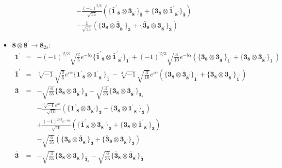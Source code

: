 \documentclass[english]{article}
\newcommand{\subcg}[3]{\big\{ {#1}\otimes{#2}\big\}^{}_{#3}}
\newcommand{\rep}[1]{\mathbf{#1}}
\begin{document}
\begin{itemize}
\begin{eqnarray*}
 & & -\frac{(-1)^{5/6}}{\sqrt{15}}\left(\subcg{\rep{\bar{1}^{\prime}}_{\rep{8}}}{\rep{\bar{3}}_{\rep{8^{\prime}}}}{\rep{\bar{3}}}+\subcg{\rep{\bar{3}}_{\rep{8}}}{\rep{\bar{1}^{\prime}}_{\rep{8^{\prime}}}}{\rep{\bar{3}}}\right) \\ 
 & & -\frac{1}{\sqrt{15}}\left(\subcg{\rep{3}_{\rep{8}}}{\rep{\bar{3}}_{\rep{8^{\prime}}}}{\rep{\bar{3}}}+\subcg{\rep{\bar{3}}_{\rep{8}}}{\rep{3}_{\rep{8^{\prime}}}}{\rep{\bar{3}}}\right)
\end{eqnarray*}
\item $\rep{8}\otimes\rep{8^{\prime}}\to\rep{8}_{2s}$:
\begin{eqnarray*}
\rep{1^{\prime}} &=& -(-1)^{2/3} \sqrt{\frac{2}{5}} e^{-i \alpha }\subcg{\rep{\bar{1}^{\prime}}_{\rep{8}}}{\rep{\bar{1}^{\prime}}_{\rep{8^{\prime}}}}{\rep{1^{\prime}}}+(-1)^{2/3} \sqrt{\frac{3}{10}} e^{-i \alpha }\left(\subcg{\rep{3}_{\rep{8}}}{\rep{\bar{3}}_{\rep{8^{\prime}}}}{\rep{1^{\prime}}}+\subcg{\rep{\bar{3}}_{\rep{8}}}{\rep{3}_{\rep{8^{\prime}}}}{\rep{1^{\prime}}}\right)
\\
\rep{\bar{1}^{\prime}} &=& \sqrt[3]{-1} \sqrt{\frac{2}{5}} e^{i \alpha }\subcg{\rep{1^{\prime}}_{\rep{8}}}{\rep{1^{\prime}}_{\rep{8^{\prime}}}}{\rep{\bar{1}^{\prime}}}-\sqrt[3]{-1} \sqrt{\frac{3}{10}} e^{i \alpha }\left(\subcg{\rep{3}_{\rep{8}}}{\rep{\bar{3}}_{\rep{8^{\prime}}}}{\rep{\bar{1}^{\prime}}}+\subcg{\rep{\bar{3}}_{\rep{8}}}{\rep{3}_{\rep{8^{\prime}}}}{\rep{\bar{1}^{\prime}}}\right)
\\
\rep{3} &=& -\sqrt{\frac{6}{35}}\subcg{\rep{3}_{\rep{8}}}{\rep{3}_{\rep{8^{\prime}}}}{\rep{3}}-\sqrt{\frac{3}{35}}\subcg{\rep{\bar{3}}_{\rep{8}}}{\rep{\bar{3}}_{\rep{8^{\prime}}}}{\rep{3}_{s}} \\ 
 & & -\frac{\sqrt[3]{-1} e^{i \alpha }}{\sqrt{10}}\left(\subcg{\rep{1^{\prime}}_{\rep{8}}}{\rep{3}_{\rep{8^{\prime}}}}{\rep{3}}+\subcg{\rep{3}_{\rep{8}}}{\rep{1^{\prime}}_{\rep{8^{\prime}}}}{\rep{3}}\right) \\ 
 & & +\frac{(-1)^{2/3} e^{-i \alpha }}{\sqrt{10}}\left(\subcg{\rep{\bar{1}^{\prime}}_{\rep{8}}}{\rep{3}_{\rep{8^{\prime}}}}{\rep{3}}+\subcg{\rep{3}_{\rep{8}}}{\rep{\bar{1}^{\prime}}_{\rep{8^{\prime}}}}{\rep{3}}\right) \\ 
 & & -\sqrt{\frac{6}{35}}\left(\subcg{\rep{3}_{\rep{8}}}{\rep{\bar{3}}_{\rep{8^{\prime}}}}{\rep{3}}+\subcg{\rep{\bar{3}}_{\rep{8}}}{\rep{3}_{\rep{8^{\prime}}}}{\rep{3}}\right)
\\
\rep{\bar{3}} &=& -\sqrt{\frac{3}{35}}\subcg{\rep{3}_{\rep{8}}}{\rep{3}_{\rep{8^{\prime}}}}{\rep{\bar{3}}_{s}}-\sqrt{\frac{6}{35}}\subcg{\rep{\bar{3}}_{\rep{8}}}{\rep{\bar{3}}_{\rep{8^{\prime}}}}{\rep{\bar{3}}} \\ 

\end{eqnarray*}
\end{itemize}
\end{document}

